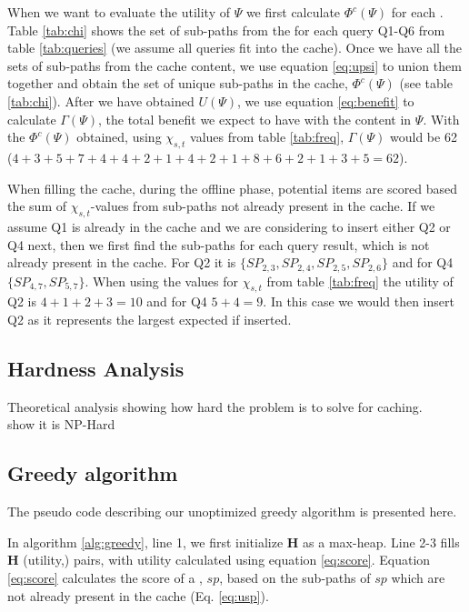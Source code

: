 When we want to evaluate the utility of $\Psi$ we first calculate $\Phi^c(\Psi)$ for each \spath. Table \ref{tab:chi} shows the set of sub-paths from the \spaths for each query Q1-Q6 from table \ref{tab:queries} (we assume all queries fit into the cache). Once we have all the sets of sub-paths from the cache content, we use equation \ref{eq:upsi} to union them together and obtain the set of unique sub-paths in the cache, $\Phi^c(\Psi)$ (see table \ref{tab:chi}). After we have obtained $U(\Psi)$, we use equation \ref{eq:benefit} to calculate $\Gamma(\Psi)$, the total benefit we expect to have with the content in $\Psi$. With the $\Phi^c(\Psi)$ obtained, using $\chi_{s,t}$ values from table \ref{tab:freq}, $\Gamma(\Psi)$ would be 62 ($4+3+5+7+4+4+2+1+4+2+1+8+6+2+1+3+5 = 62$).

When filling the cache, during the offline phase, potential \spath items are scored based the sum of $\chi_{s,t}$-values from sub-paths not already present in the cache. If we assume Q1 is already in the cache and we are considering to insert either Q2 or Q4 next, then we first find the sub-paths for each query result, which is not already present in the cache. For Q2 it is $\{SP_{2,3},SP_{2,4},SP_{2,5},SP_{2,6}\}$ and for Q4 $\{SP_{4,7},SP_{5,7}\}$. When using the values for $\chi_{s,t}$ from table \ref{tab:freq} the utility of Q2 is $4+1+2+3=10$ and for Q4 $5+4=9$. In this case we would then insert Q2 as it represents the largest expected if inserted.

\subsection{Hardness Analysis}
Theoretical analysis showing how hard the problem is to solve for \spath caching.\\
show it is NP-Hard
 

\subsection{Greedy algorithm}
The pseudo code describing our unoptimized greedy algorithm is presented here.


In algorithm \ref{alg:greedy}, line 1, we first initialize \textbf{H} as a max-heap. Line 2-3 fills \textbf{H} (utility,\spath) pairs, with utility calculated using equation \ref{eq:score}. 
Equation \ref{eq:score} calculates the score of a \spathns, $sp$, based on the sub-paths of $sp$ which are not already present in the cache (Eq. \ref{eq:usp}).


